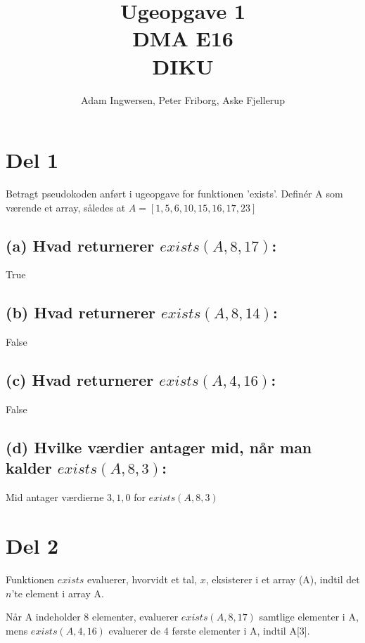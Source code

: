 \documentclass[11pt,a4paper,final]{article}
\begin{document}
\author{Adam Ingwersen, Peter Friborg, Aske Fjellerup}
\title{Ugeopgave 1 \\ DMA E16 \\ DIKU}
\maketitle


\section*{Del 1}
Betragt pseudokoden anført i ugeopgave for funktionen 'exists'. Definér A som værende et array, således at $A = [1, 5, 6, 10, 15, 16, 17, 23] $

\subsection*{(a) Hvad returnerer $exists(A, 8, 17)$:}

True

\subsection*{(b) Hvad returnerer $exists(A, 8, 14)$:}

False

\subsection*{(c) Hvad returnerer $exists(A, 4, 16)$:}

False

\subsection*{(d) Hvilke værdier antager mid, når man kalder $exists(A, 8, 3)$:}

Mid antager værdierne ${3, 1, 0}$ for $exists(A, 8, 3)$


\section*{Del 2}

Funktionen $exists$ evaluerer, hvorvidt et tal, $x$, eksisterer i et array (A), indtil det $n$'te element i array A. 

Når A indeholder 8 elementer, evaluerer $exists(A, 8, 17)$ samtlige elementer i A, mens $exists(A, 4, 16)$ evaluerer de 4 første elementer i A, indtil A[3]. 
\end{document}

